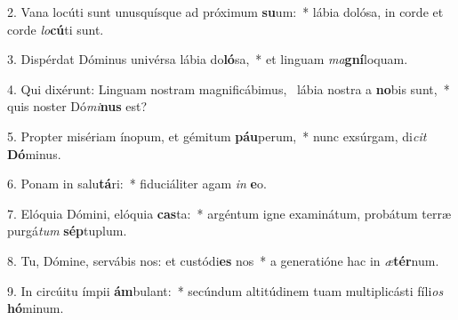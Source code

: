 2. Vana locúti sunt unusquísque ad próximum \textbf{su}um:~*  lábia dolósa, in corde et corde \textit{lo}\textbf{cú}ti sunt.\

3. Dispérdat Dóminus univérsa lábia do\textbf{ló}sa,~*  et linguam \textit{ma}\textbf{gní}loquam.\

4. Qui dixérunt: Linguam nostram magnificábimus, \dag\  lábia nostra a \textbf{no}bis sunt,~*  quis noster Dó\textit{mi}\textbf{nus} est?\

5. Propter misériam ínopum, et gémitum \textbf{páu}perum,~*  nunc exsúrgam, di\textit{cit} \textbf{Dó}minus.\

6. Ponam in salu\textbf{tá}ri:~*  fiduciáliter agam \textit{in} \textbf{e}o.\

7. Elóquia Dómini, elóquia \textbf{cas}ta:~*  argéntum igne examinátum, probátum terræ purgá\textit{tum} \textbf{sép}tuplum.\

8. Tu, Dómine, servábis nos: et custódi\textbf{es} nos~*  a generatióne hac in \textit{æ}\textbf{tér}num.\

9. In circúitu ímpii \textbf{ám}bulant:~*  secúndum altitúdinem tuam multiplicásti fíli\textit{os} \textbf{hó}minum.\

